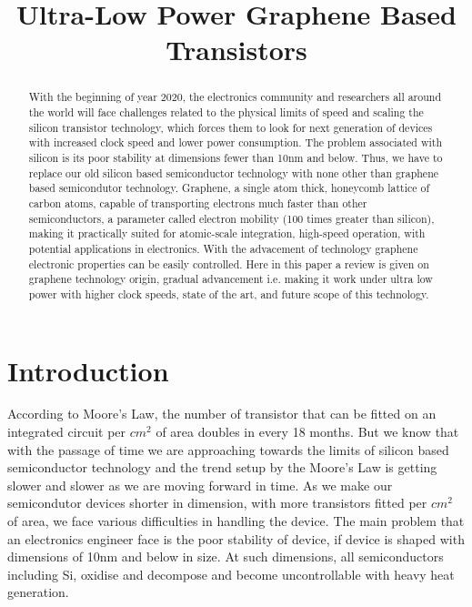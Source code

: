 \documentclass[conference]{IEEEtran}
\begin{document}
\title{Ultra-Low Power Graphene Based Transistors}


\author{
}


\maketitle
\thispagestyle{plain}
\pagestyle{plain}

\begin{abstract}
With the beginning of year 2020, the electronics community and researchers all around the world will face challenges related to the
physical limits of speed and scaling the silicon transistor technology, which forces them to look for next generation of devices with
increased clock speed and lower power consumption. The problem associated with silicon is its poor stability at dimensions fewer than 10nm and below. Thus, we have to replace our old silicon based semiconductor technology with none other than graphene based semicondutor technology. Graphene, a single atom thick, honeycomb lattice of carbon atoms, capable of transporting electrons much faster than other semiconductors, a parameter called electron mobility (100 times greater than silicon), making it practically suited for atomic-scale integration, high-speed operation, with potential applications in electronics. With the advacement of technology graphene electronic properties can be easily controlled. Here in this paper a review is given on graphene technology origin, gradual advancement i.e. making it work under ultra low power with higher clock speeds, state of the art, and future scope of this technology.
\end{abstract}



\IEEEpeerreviewmaketitle

\section{\textbf{Introduction}}

According to Moore's Law, the number of transistor that can be fitted on an integrated circuit per $cm^2$ of area doubles in every 18 months. But we know that with the passage of time we are approaching towards the limits of silicon based semiconductor technology and the trend setup by the Moore's Law is getting slower and slower as we are moving forward in time. As we make our semicondutor devices shorter in dimension, with more transistors fitted per $cm^2$ of area, we face various difficulties in handling the device. The main problem that an electronics engineer face is the poor stability of device, if device is shaped with dimensions of 10nm and below in size. At such dimensions, all semiconductors including Si, oxidise and decompose and become uncontrollable with heavy heat generation.
\\
\end{document}
